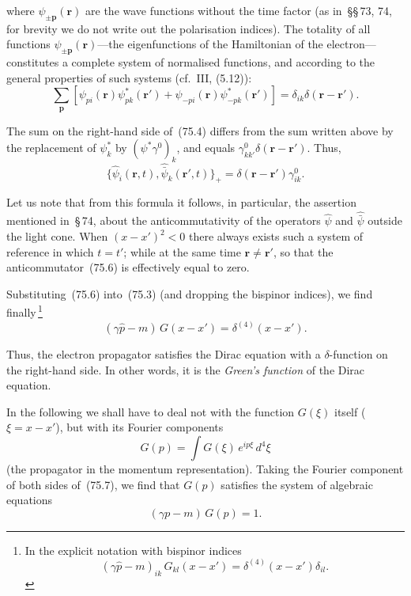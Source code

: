 where $\psi_{\pm\mathbf{p}}(\mathbf{r})$ are the wave functions without the time factor (as in~\S\S\,73, 74, for brevity we do not write out the polarisation indices). The totality of all functions $\psi_{\pm\mathbf{p}}(\mathbf{r})$---the eigenfunctions of the Hamiltonian of the electron---constitutes a complete system of normalised functions, and according to the general properties of such systems (cf.~III, (5.12)):
\begin{equation}
\sum_\mathbf{p}[\psi_{pi}(\mathbf{r})\psi^*_{pk}(\mathbf{r}') + \psi_{-pi}(\mathbf{r})\psi^*_{-pk}(\mathbf{r}')] = \delta_{ik}\delta(\mathbf{r} - \mathbf{r}').
\tag{75.5}
\end{equation}

The sum on the right-hand side of~(75.4) differs from the sum written above by the replacement of $\psi^*_k$ by $(\psi^*\gamma^0)_k$, and equals $\gamma^0_{kk'}\delta(\mathbf{r} - \mathbf{r}')$. Thus,
\begin{equation}
\{\hat{\psi}_i(\mathbf{r},t),\hat{\bar{\psi}}_k(\mathbf{r}',t)\}_+ = \delta(\mathbf{r} - \mathbf{r}')\gamma^0_{ik}.
\tag{75.6}
\end{equation}

Let us note that from this formula it follows, in particular, the assertion mentioned in~\S\,74, about the anticommutativity of the operators $\hat{\psi}$ and $\hat{\bar{\psi}}$ outside the light cone. When $(x - x')^2 < 0$ there always exists such a system of reference in which $t = t'$; while at the same time $\mathbf{r} \neq \mathbf{r}'$, so that the anticommutator~(75.6) is effectively equal to zero.

Substituting~(75.6) into~(75.3) (and dropping the bispinor indices), we find finally\,\footnote{In the explicit notation with bispinor indices
\begin{equation}
(\gamma\hat{p} - m)_{ik}\,G_{kl}(x - x') = \delta^{(4)}(x - x')\delta_{il}.
\tag{75.7a}
\end{equation}}
\begin{equation}
(\gamma\hat{p} - m)\,G(x - x') = \delta^{(4)}(x - x').
\tag{75.7}
\end{equation}

Thus, the electron propagator satisfies the Dirac equation with a $\delta$-function on the right-hand side. In other words, it is the \textit{Green's function} of the Dirac equation.

In the following we shall have to deal not with the function $G(\xi)$ itself ($\xi = x - x'$), but with its Fourier components
\begin{equation}
G(p) = \int G(\xi)\,e^{ip\xi}\,d^4\xi
\tag{75.8}
\end{equation}
(the propagator in the momentum representation). Taking the Fourier component of both sides of~(75.7), we find that $G(p)$ satisfies the system of algebraic equations
\begin{equation}
(\gamma p - m)\,G(p) = 1.
\tag{75.9}
\end{equation}

